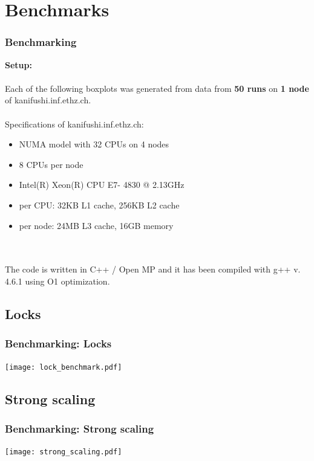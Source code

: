 \documentclass{beamer}
\begin{document}
\section{Benchmarks}

\begin{frame}
\frametitle{Benchmarking}
\textbf{Setup:}\\ \quad\\
Each of the following boxplots was generated from data from \textbf{50 runs} on \textbf{1 node} of kanifushi.inf.ethz.ch.\\
\quad\\
Specifications of kanifushi.inf.ethz.ch:
\begin{itemize}
\item NUMA model with 32 CPUs on 4 nodes
\item 8 CPUs per node
\item Intel(R) Xeon(R) CPU E7- 4830  @ 2.13GHz
\item per CPU: 32KB L1 cache, 256KB L2 cache
\item per node: 24MB L3 cache, 16GB memory
\end{itemize}
\quad\\ \quad\\
The code is written in C++ / Open MP and it has been compiled with g++ v. 4.6.1 using O1 optimization.

\end{frame}

\subsection{Locks}
\begin{frame}
\frametitle{Benchmarking: Locks}
\begin{center}
	\texttt{[image: lock\_benchmark.pdf]}
\end{center}
\end{frame}

\subsection{Strong scaling}
\begin{frame}
\frametitle{Benchmarking: Strong scaling}
\begin{center}
	\texttt{[image: strong\_scaling.pdf]}
\end{center}
\end{frame}
\end{document}
